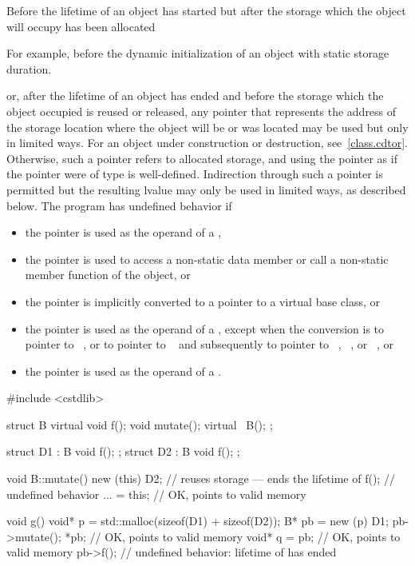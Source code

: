 \pnum
Before the lifetime of an object has started but after the storage which
the object will occupy has been allocated
\begin{footnote}
For example, before the dynamic initialization of
an object with static storage duration.

\end{footnote}
or, after the lifetime of an object has ended and before the storage
which the object occupied is reused or released, any pointer that represents the address of
the storage location where the object will be or was located may be
used but only in limited ways.
For an object under construction or destruction, see~\ref{class.cdtor}.
Otherwise, such
a pointer refers to allocated
storage, and using the pointer as
if the pointer were of type  is
well-defined. Indirection through such a pointer is permitted but the resulting lvalue may only be used in
limited ways, as described below. The
program has undefined behavior if
\begin{itemize}
\item
  the pointer is used as the operand of a ,
\item
  the pointer is used to access a non-static data member or call a
  non-static member function of the object, or
\item
  the pointer is implicitly converted to a pointer
  to a virtual base class, or
\item
  the pointer is used as the operand of a
  , except when the conversion
  is to pointer to \cv{}~, or to pointer to \cv{}~
  and subsequently to pointer to
  \cv{}~,
  \cv{}~, or
  \cv{}~, or
\item
  the pointer is used as the operand of a
  .
\end{itemize}
\begin{example}
\begin{codeblock}
#include <cstdlib>

struct B {
  virtual void f();
  void mutate();
  virtual ~B();
};

struct D1 : B { void f(); };
struct D2 : B { void f(); };

void B::mutate() {
  new (this) D2;    // reuses storage --- ends the lifetime of 
  f();              // undefined behavior
  ... = this;       // OK,  points to valid memory
}

void g() {
  void* p = std::malloc(sizeof(D1) + sizeof(D2));
  B* pb = new (p) D1;
  pb->mutate();
  *pb;              // OK,  points to valid memory
  void* q = pb;     // OK,  points to valid memory
  pb->f();          // undefined behavior: lifetime of  has ended
}
\end{codeblock}
\end{example}

